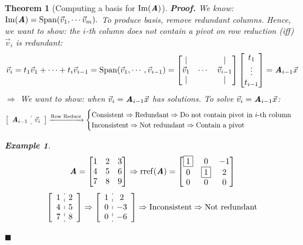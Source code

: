 \documentclass[12pt, a4paper]{article}
\newtheorem{thm}{Theorem}[subsection]
\newtheorem{eg}{Example}[subsection]
\newenvironment*{prf}{\indent\textbf{\textit{Proof. }}}{\hfill $\blacksquare$\par}
\def\IM{{\mathrm{Im}}}
\def\rref{\mathrm{rref}}
\def\Span{\mathrm{Span}}
\def\vecx{\vec{x}}
\def\vecv{\vec{v}}
\def\matrixA{\textbf{\emph{A}}}
\begin{document}
\begin{thm}[Computing a basis for $\IM(\matrixA)$]
	\begin{prf}
		We know: $\IM(\matrixA)=\Span(\vecv_1,\cdots\vecv_m).$ To produce basis, remove redundant columns. 
		Hence, we want to show: the $i$-th column does not contain a pivot on row reduction \emph(iff) $\vecv_i$ is redundant: 
		\[\vecv_i=t_1\vecv_1+\cdots+t_i\vecv_{i-1}=\Span(\vecv_1,\cdots,\vecv_{i-1})=\begin{bmatrix}|&&|\\\vecv_1&\cdots&\vecv_{i-1}\\|&&|\end{bmatrix}\begin{bmatrix}t_1\\\vdots\\t_{i-1}\end{bmatrix}=\matrixA_{i-1}\vecx\]
		$\Rightarrow$ We want to show: when $\vecv_i=\matrixA_{i-1}\vecx$ has solutions. To solve $\vecv_i=\matrixA_{i-1}\vecx$: 
		\[\left[\begin{array}{c:c}\matrixA_{i-1}&\vecv_i\end{array}\right]\xrightarrow[]{\text{Row Reduce}}\begin{cases}\text{Consistent}\Rightarrow\text{Redundant}\Rightarrow\text{Do not contain pivot in }i\text{-th column}\\\text{Inconsistent}\Rightarrow\text{Not redundant}\Rightarrow\text{Contain a pivot}\end{cases}\]
		\begin{eg}
			\[\matrixA=\begin{bmatrix}1&2&3\\4&5&6\\7&8&9\end{bmatrix}\Rightarrow\rref(\matrixA)=\begin{bmatrix}\boxed{1}&0&-1\\0&\boxed{1}&2\\0&0&0\end{bmatrix}\]
			\[\left[\begin{array}{c:c}\begin{matrix}1\\4\\7\end{matrix}&\begin{matrix}2\\5\\8\end{matrix}\end{array}\right]\Rightarrow\left[\begin{array}{c:c}\begin{matrix}1\\0\\0\end{matrix}&\begin{matrix}2\\-3\\-6\end{matrix}\end{array}\right]\Rightarrow\text{Inconsistent}\Rightarrow\text{Not redundant}\]

\end{eg}
\end{prf}
\end{thm}
\end{document}

